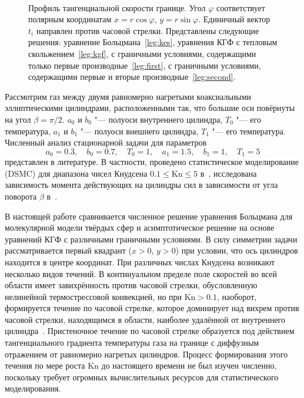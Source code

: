 \documentclass[
aps,%
12pt,%
final,%
notitlepage,%
oneside,%
onecolumn,%
nobibnotes,%
nofootinbib,%
superscriptaddress,%
noshowpacs,%
showkeys,%
floatfix,%
tightenlines,%
centertags]%
{revtex4}
\newcommand{\Kn}{\mathrm{Kn}}
\begin{document}
\begin{figure}
    \centering
    \\
    \caption{
        Профиль тангенциальной скорости границе. Угол \(\varphi\) соответствует полярным координатам
        \(x=r\cos\varphi\), \(y=r\sin\varphi\). Единичный вектор \(t_i\) направлен против часовой стрелки.
        Представлены следующие решения: уравнение Больцмана~\ref{leg:kes},
        уравнения КГФ с тепловым скольжением~\ref{leg:kgf},
        с граничными условиями, содержащими только первые производные~\ref{leg:first},
        с граничными условиями, содержащими первые и вторые производные~\ref{leg:second}.
    }
    \label{fig:profile-vel}
\end{figure}

Рассмотрим газ между двумя равномерно нагретыми коаксиальными эллиптическими цилиндрами,
расположенными так, что большие оси повёрнуты на угол \(\beta=\pi/2\).
\(a_0\) и \(b_0\) "--- полуоси внутреннего цилиндра, \(T_0\) "--- его температура,
\(a_1\) и \(b_1\) "--- полуоси внешнего цилиндра, \(T_1\) "--- его температура.
Численный анализ стационарной задачи для параметров
\[ a_0 = 0.3, \quad b_0 = 0.7, \quad T_0 = 1, \quad a_1 = 1.5, \quad b_1 = 1, \quad T_1 = 5 \]
представлен в литературе.
В частности, проведено статистическое моделирование (DSMC) для диапазона чисел
Кнудсена \(0.1\le\Kn\le5\) в~\cite{Sone1998}, исследована зависимость момента действующих
на цилиндры сил в зависимости от угла поворота \(\beta\) в~\cite{Rogozin2014}.

В настоящей работе сравнивается численное решение уравнения Больцмана для молекулярной модели твёрдых сфер
и асимптотическое решение на основе уравнений КГФ с различными граничными условиями.
В силу симметрии задачи рассматривается первый квадрант (\(x>0\), \(y>0\)) при условии,
что ось цилиндров находится в центре координат.
При различных числах Кнудсена возникают несколько видов течений.
В континуальном пределе поле скоростей во всей области имеет завихрённость против часовой стрелки,
обусловленную нелинейной термострессовой конвекцией,
но при \(\Kn>0.1\), наоборот, формируется течение по часовой стрелке,
которое доминирует над вихрем против часовой стрелки, находящимся в области,
наиболее удалённой от внутреннего цилиндра~\cite{Sone1998}.
Пристеночное течение по часовой стрелке образуется под действием тангенциального градиента температуры газа
на границе с диффузным отражением от равномерно нагретых цилиндров.
Процесс формирования этого течения по мере роста \(\Kn\) до настоящего времени не был изучен численно,
поскольку требует огромных вычислительных ресурсов для статистического моделирования.
\end{document}
